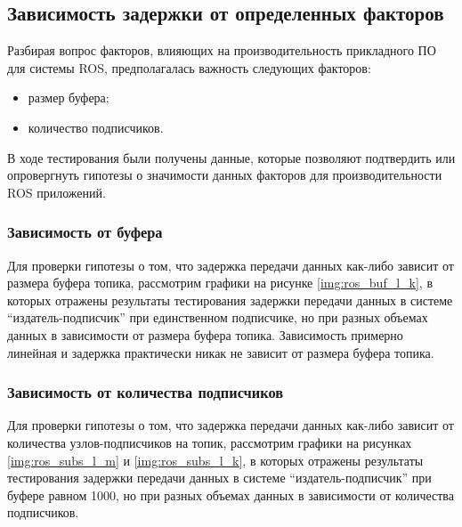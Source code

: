\subsection{Зависимость задержки от определенных факторов}
Разбирая вопрос факторов, влияющих на производительность прикладного ПО для системы ROS, предполагалась важность следующих факторов:
\begin{itemize}[noitemsep]
	\item размер буфера;
	\item количество подписчиков.
\end{itemize}
В ходе тестирования были получены данные, которые позволяют подтвердить или опровергнуть гипотезы о значимости данных факторов для производительности ROS приложений.

\subsubsection{Зависимость от буфера}
Для проверки гипотезы о том, что задержка передачи данных как-либо зависит от размера буфера топика, рассмотрим графики на рисунке \ref{img:ros_buf_l_k}, в которых отражены результаты тестирования задержки передачи данных в системе \enquote{издатель-подписчик} при единственном подписчике, но при разных объемах данных в зависимости  от размера буфера топика.
Зависимость примерно линейная и задержка практически никак не зависит от размера буфера топика.

\subsubsection{Зависимость от количества подписчиков}
Для проверки гипотезы о том, что задержка передачи данных как-либо зависит от количества узлов-подписчиков на топик, рассмотрим графики на рисунках \ref{img:ros_subs_l_m} и \ref{img:ros_subs_l_k}, в которых отражены результаты тестирования задержки передачи данных в системе \enquote{издатель-подписчик} при буфере равном 1000, но при разных объемах данных в зависимости  от количества подписчиков.


